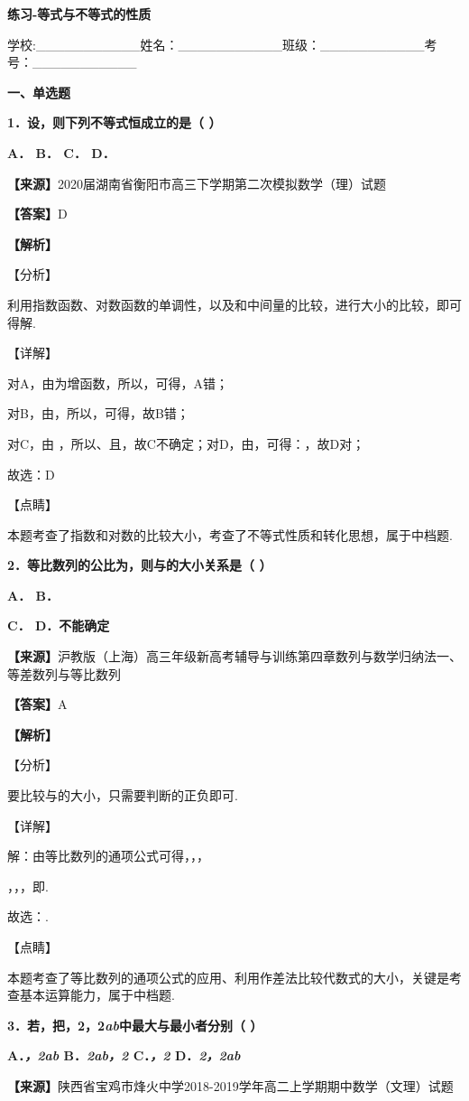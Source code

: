 \textbf{练习-等式与不等式的性质}

学校:\_\_\_\_\_\_\_\_\_\_\_姓名：\_\_\_\_\_\_\_\_\_\_\_班级：\_\_\_\_\_\_\_\_\_\_\_考号：\_\_\_\_\_\_\_\_\_\_\_

\textbf{一、单选题}

\textbf{1．设，则下列不等式恒成立的是（ ）}

\textbf{A． B． C． D．}

\textbf{【来源】}2020届湖南省衡阳市高三下学期第二次模拟数学（理）试题

\textbf{【答案】}D

\textbf{【解析】}

【分析】

利用指数函数、对数函数的单调性，以及和中间量的比较，进行大小的比较，即可得解.

【详解】

对A，由为增函数，所以，可得，A错；

对B，由，所以，可得，故B错；

对C，由 ，所以、且，故C不确定；对D，由，可得：，故D对；

故选：D

【点睛】

本题考查了指数和对数的比较大小，考查了不等式性质和转化思想，属于中档题.

\textbf{2．等比数列的公比为，则与的大小关系是（ ）}

\textbf{A． B．}

\textbf{C． D．不能确定}

\textbf{【来源】}沪教版（上海）高三年级新高考辅导与训练第四章数列与数学归纳法一、等差数列与等比数列

\textbf{【答案】}A

\textbf{【解析】}

【分析】

要比较与的大小，只需要判断的正负即可.

【详解】

解：由等比数列的通项公式可得，，，

，，，即.

故选：.

【点睛】

本题考查了等比数列的通项公式的应用、利用作差法比较代数式的大小，关键是考查基本运算能力，属于中档题.

\textbf{3．若，把，2，2\emph{ab}中最大与最小者分别（ ）}

\textbf{A．\emph{，2ab} B．\emph{2ab，2} C．\emph{，2} D．\emph{2，2ab}}

\textbf{【来源】}陕西省宝鸡市烽火中学2018-2019学年高二上学期期中数学（文理）试题

